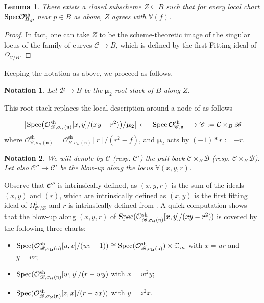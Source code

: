 \documentclass[a4paper,12pt]{amsart}
\newcommand{\mtf}[1]{\mathfrak{#1}}
\DeclareMathOperator{\Spec}{Spec}
\DeclareMathOperator{\sh}{sh}
\newcommand{\bG}{\mathbb{G}}
\newcommand{\bV}{{\mathbb V}}
\newcommand{\sC}{{\mathscr{C}}}
\newcommand{\sB}{{\mathscr{B}}}
\newcommand{\cO}{{\mathcal{O}}}
\newcommand{\cU}{{\mathcal{U}}}
\newcommand{\bmu}{\bm{\mu}}
\newcommand\spec{\text{\rm Spec}}
\newcommand\cC{{\mathcal{C}}}
\newtheorem{lemma}[theorem]{Lemma}
\newtheorem*{notation}{Notation}
\theoremstyle{definition}
\theoremstyle{remark}
\begin{document}
\begin{lemma}\label{lemma_nodal_locus_is_global}
    There exists a closed subscheme $Z\subseteq B$ such that for every local chart $\spec \cO_{B,p}^{\sh}$ near $p\in B$ as above, $Z$ agrees with $\bV(f)$.
\end{lemma} 


\begin{proof} In fact, one can take $Z$ to be the scheme-theoretic image of the singular locus of the family of curves $\cC\rightarrow B$, which is defined by the first Fitting ideal of $\Omega_{\cC/B}$.
\end{proof}

Keeping the notation as above, we proceed as follows. 
\begin{notation}\textup{Let $\sB\to B$ be the $\bmu_2$-root stack of $B$ along $Z$.}\end{notation}This root stack replaces the local description around a node of  as follows 

\begin{equation}
\big[\spec\big(\cO_{\sB,\sigma_\cU(\mtf{n})}^{\sh}[x,y]/(xy-r^2)\big)/\bmu_2\big]\longleftarrow \Spec\cO_{\sC,\mtf{n}}^{\sh}\longrightarrow \sC:=\cC\times_B \sB
\end{equation}
where $\cO_{\sB,\sigma_\cU(\mtf{n})}^{\sh}=\cO_{B,\sigma_\cU(\mtf{n})}^{\sh}[r]/(r^2-f)$, and $\bmu_2$ acts by $(-1)*r := -r$.

\begin{notation}
    \textup{We will denote by $\sC$ (resp. $\sC'$) the pull-back $\cC\times_B\sB$ (resp. $\cC\times_B\sB$). Let also $\sC''\rightarrow \sC'$ be the blow-up along the locus $\bV(x,y,r)$.}
\end{notation}
 Observe that $\sC''$ is intrinsically defined, as $(x,y,r)$ is the sum of the ideals $(x,y)$ and $(r)$, which are intrinsically defined as $(x,y)$ is the first fitting ideal of $\Omega^1_{\sC'/\sB}$ and $r$ is intrinsically defined from .
A quick computation shows that the blow-up along $(x,y,r)$ of $\spec(\cO_{\sB,\sigma_\cU(\mtf{n})}^{\sh}[x,y]/(xy-r^2))$ is covered by the following three charts:
    \begin{itemize}
        \item[(i)] $\spec(\cO_{\sB,\sigma_\cU(\mtf{n})}^{\sh}[u,v]/(uv-1))\cong \spec(\cO_{\sB,\sigma_\cU(\mtf{n})}^{\sh})\times \bG_m$ with $x=ur$ and $y=vr$;
        \item[(ii)]$\spec(\cO_{\sB,\sigma_\cU(\mtf{n})}^{\sh}[w,y]/(r-wy)$ with $x=w^2y$;
        \item [(iii)] $\spec(\cO_{\sB,\sigma_\cU(\mtf{n})}^{\sh}[z,x]/(r-zx))$ with $y=z^2x$.
    \end{itemize}
 
\end{document}
